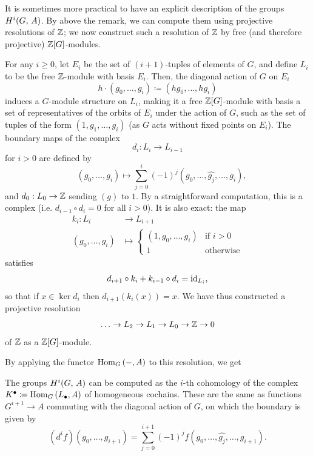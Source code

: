 \documentclass[a4paper, oneside]{memoir}
\begin{document}
It is sometimes more practical to have an explicit description of the groups $H^{i}( G, \, A )$. By above the remark, we can compute them using projective resolutions of $\mathbb{Z}$; we now construct such a resolution of $\mathbb{Z}$ by free (and therefore projective) $\mathbb{Z}[G]$-modules.

For any $i\geq 0$, let $E_i$ be the set of $(i+1)$-tuples of elements of $G$, and define $L_i$ to be the free $\mathbb{Z}$-module with basis $E_i$. Then, the diagonal action of $G$ on $E_i$
\[
	h\cdot (g_0,\dots , g_i) \coloneqq (h g_0 ,\dots , h g_{i} )
\]
induces a $G$-module structure on $L_i$, making it a free $\mathbb{Z}[G]$-module with basis a set of representatives of the orbits of $E_i$ under the action of $G$, such as the set of tuples of the form $(1,g_1,\dots , g_i)$ (as $G$ acts without fixed points on $E_i$). The boundary maps of the complex
\[
	d_i: L_i \to L_{i-1}
\]
for $i>0$ are defined by
\[
	\quad (g_0,\dots , g_i) \mapsto \sum_{j=0}^{i} (-1)^j (g_0,\dots , \hat{g_j},\dots , g_i),
\]
and $d_0:L_0\to\mathbb{Z}$ sending $(g)$ to $1$. By a straightforward computation, this is a complex (i.e. $d_{i-1}\circ d_i=0$ for all $i>0$). It is also exact: the map
\begin{align*}
	k_i: L_i          & \to L_{i+1} \\
	(g_0,\dots , g_i) & \mapsto
	\begin{cases}
		(1,g_0,\dots , g_i) & \text{if } i>0   \\
		1                   & \text{otherwise}
	\end{cases}
\end{align*}
satisfies
\[
	d_{i+1}\circ k_i + k_{i-1}\circ d_i = \operatorname{id}_{L_i},
\]
so that if $x\in\ker{d_i}$ then $d_{i+1}(k_i(x))=x$.
We have thus constructed a projective resolution
\[
	\ldots\to L_2\to L_1\to L_0\to\mathbb{Z}\to 0
\]
of $\mathbb{Z}$ as a $\mathbb{Z}[G]$-module.

By applying the functor $\operatorname{Hom}_G{(-,A)}$ to this resolution, we get
\begin{theorem}
	The groups $H^{i}( G, \, A )$ can be computed as the $i$-th cohomology of the complex $K^\bullet\coloneqq \operatorname{Hom}_G{(L_\bullet,A)}$ of \textnormal{homogeneous} cochains. These are the same as functions $G^{i+1}\to A$ commuting with the diagonal action of $G$, on which the boundary is given by
	\[
		(d^i f)(g_0,\dots , g_{i+1})=\sum_{j=0}^{i+1} (-1)^j f(g_0,\dots , \hat{g_j},\dots , g_{i+1}).
	\]
\end{theorem}
\end{document}
